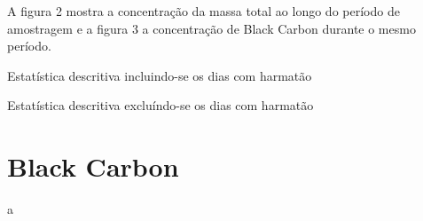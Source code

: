 A figura 2 mostra a concentração da massa total ao longo do período de amostragem e a figura 3 a concentração de Black Carbon durante o mesmo período.

\begin{table}[H]
 \centering
  
  \caption{Estatística descritiva incluindo-se os dias com harmatão}
\end{table}

\begin{table}[H]
  \centering
  
  \caption{Estatística descritiva excluíndo-se os dias com harmatão}
\end{table}

\section{Black Carbon}
a



